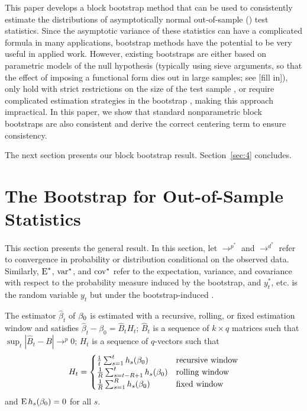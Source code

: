 \documentclass[12pt,fleqn]{article}
\begin{document}
This paper develops a block bootstrap method that can be used to
consistently estimate the distributions of asymptotically normal
out-of-sample (\oos) test statistics. Since the asymptotic variance of
these statistics can have a complicated formula in many applications,
bootstrap methods have the potential to be very useful in applied
work. However, existing bootstraps are either based on parametric
models of the null hypothesis (typically using sieve arguments, so
that the effect of imposing a functional form dies out in large
samples; see [fill in]), only hold with strict restrictions on the
size of the test sample \citep{Whi:00,Han:05}, or require complicated
estimation strategies in the bootstrap \citep{CoS:07}, making this
approach impractical. In this paper, we show that standard
nonparametric block bootstraps are also consistent and derive the
correct centering term to ensure consistency.

The next section presents our block bootstrap result.
Section~\ref{sec:4} concludes.

\section{The Bootstrap for Out-of-Sample Statistics}\label{sec:1b}
This section
presents the general result.  In this section, let $\to^{p^{*}}$ and
$\to^{d^{*}}$ refer to convergence in probability or distribution
conditional on the observed data.  Similarly, $\operatorname{E}^{*}$, $\operatorname{var}^{*}$,
and $\operatorname{cov}^{*}$ refer to the expectation, variance, and covariance with
respect to the probability measure induced by the bootstrap, and
$y_t^{*}$, etc. is the random variable $y_t$ but under the
bootstrap-induced \cdf.

\begin{asmp}\label{a1}
  The estimator $\hat{\beta}_t$ of $\btrue$ is estimated with a
  recursive, rolling, or fixed estimation window and satisfies
  $\hat{\beta}_{t} - \beta_{0} = \hat{B}_{t} H_t$; $\hat{B}_{t}$ is a
  sequence of $k \times q$ matrices such that $\sup_t |\hat{B}_t - B|
  \to^p 0$; $H_{t}$ is a sequence of $q$-vectors such that
  \begin{equation}
    H_{t} = \begin{cases}
      \tfrac1t \sum_{s=1}^t h_{s}(\btrue) & \text{recursive window} \\
      \tfrac1R \sum_{s=t-R+1}^t h_{s}(\btrue) & \text{rolling window} \\
      \tfrac1R \sum_{s=1}^R h_{s}(\btrue) & \text{fixed window} \\
    \end{cases}
  \end{equation}
  and $\E h_{s}(\btrue) = 0$ for all $s$.
\end{asmp}
\end{document}
